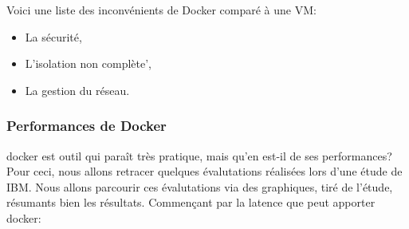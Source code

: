 \documentclass[
    iai, %
    il, %
]{heig-tb}
\begin{document}
Voici une liste des inconvénients de Docker comparé à une VM:
\begin{itemize}
    \item La sécurité, \cite{koukia}
    \item L'isolation non complète', \cite{koukia}
    \item La gestion du réseau. \cite{koukia}
\end{itemize}






\subsubsection{Performances de Docker}
\Gls{docker} est outil qui paraît très pratique, mais qu'en est-il de ses performances?
Pour ceci, nous allons retracer quelques évalutations réalisées lors d'une étude de IBM. Nous allons parcourir ces évalutations via des graphiques, tiré de l'étude, résumants bien les résultats.
Commençant par la latence que peut apporter \Gls{docker}:
\end{document}

